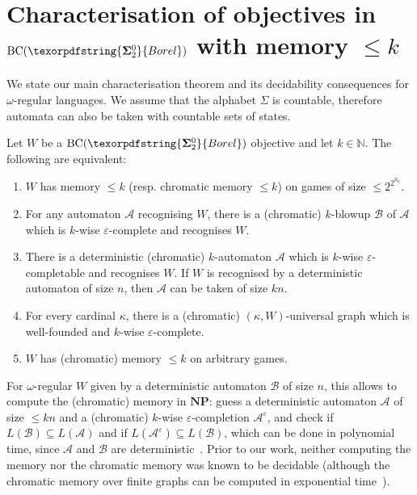 \documentclass[a4paper,UKenglish,cleveref, thm-restate]{lipics-v2021}
\newcommand{\eps}{\varepsilon}
\newcommand{\N}{\mathbb N}
\newcommand{\boldclass}[3]{\texorpdfstring{\ensuremath{\mathbf{#1}^{#2}_{#3}}}{Borel}}
\newcommand{\bsigma}[1]{\boldclass{\Sigma}{0}{#1}}
\newcommand{\BCSigma}{\mathrm{BC}(\boldclass{\Sigma}{0}{2})}
\newcommand{\A}{\mathcal{A}}
\newcommand{\NP}{\textbf{NP}}
\newcommand{\B}{\mathcal B}
\newcommand{\BC}{\text{BC}}
\newcommand{\oo}{\omega}
\begin{document}
\section{Characterisation of objectives in $\BC(\bsigma 2)$ with memory $\leq k$}
We state our main characterisation theorem and its decidability consequences for $\oo$-regular languages.
We assume that the alphabet $\Sigma$ is countable, therefore automata can also be taken with countable sets of states.


\begin{theorem}\label{thm:main-charac}
Let $W$ be a $\BCSigma$ objective and let $k \in \N$.
The following are equivalent:
\begin{enumerate}[(i.)]
    \item\label{item:memory-small-games} $W$ has memory $\leq k$ (resp. chromatic memory $\leq k$) on games of size $\leq 2^{2^{\aleph_0}}$.
    \item\label{item:existence-automata} For any automaton $\A$ recognising $W$, there is a (chromatic) $k$-blowup $\B$ of $\A$ which is $k$-wise $\eps$-complete and recognises $W$.
    \item\label{item:existence-det-automata} There is a deterministic (chromatic) $k$-automaton $\A$ which is $k$-wise $\eps$-completable and recognises $W$. If $W$ is recognised by a deterministic automaton of size $n$, then $\A$ can be taken of size $kn$.
    \item\label{item:existence-universal-graph} For every cardinal $\kappa$, there is a (chromatic)  $(\kappa,W)$-universal graph which is well-founded and $k$-wise $\eps$-complete.
    \item\label{item:memory-arbitrary-games} $W$ has (chromatic) memory $\leq k$ on arbitrary games.
\end{enumerate}
\end{theorem}

For $\omega$-regular $W$ given by a deterministic automaton $\B$ of size $n$, this allows to compute the (chromatic) memory in $\NP$: guess a deterministic automaton $\A$ of size $\leq kn$ and a (chromatic) $k$-wise $\eps$-completion $\A^\eps$, and check if  $L(\B) \subseteq L(\A)$ and if $L(\A^\eps) \subseteq L(\B)$, which can be done in polynomial time, since $\A$ and $\B$ are deterministic~\cite{ClarkeDK93Unified}.
Prior to our work, neither computing the memory nor the chromatic memory was known to be decidable (although the chromatic memory over finite graphs can be computed in exponential time~\cite{Kop08Thesis}).
\end{document}
